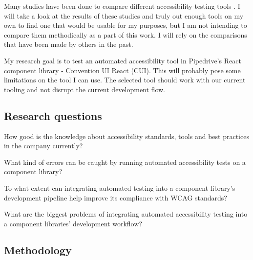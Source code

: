 \documentclass{master_thesis}
\begin{document}
Many studies have been done to compare different accessibility testing tools \citep{Alsaeedi2020, Ismailova2022, Sane2021, Vigo2013, RybinKoob2022, Duran2017}. I will take a look at the results of these studies and truly out enough tools on my own to find one that would be usable for my purposes, but I am not intending to compare them methodically as a part of this work. I will rely on the comparisons that have been made by others in the past.

My research goal is to test an automated accessibility tool in Pipedrive's React component library - Convention UI React (CUI). This will probably pose some limitations on the tool I can use. The selected tool should work with our current tooling and not disrupt the current development flow.

\subsection{Research questions}

	\begin{RQlist}
		\item How good is the knowledge about accessibility standards, tools and best practices in the company currently?
		\item What kind of errors can be caught by running automated accessibility tests on a component library?
		\item To what extent can integrating automated testing into a component library's development pipeline help improve its compliance with WCAG standards?
		\item What are the biggest problems of integrating automated accessibility testing into a component libraries' development workflow?
	\end{RQlist}

\subsection{Methodology}
\end{document}
